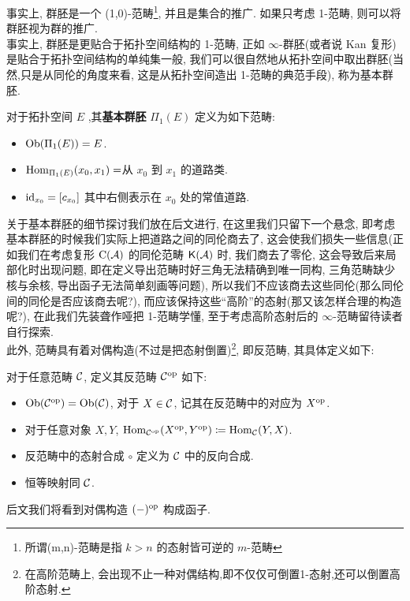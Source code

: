 事实上, 群胚是一个 (1,0)-范畴\footnote{所谓(m,n)-范畴是指 $k>n$ 的态射皆可逆的 $m$-范畴}, 并且是集合的推广. 如果只考虑 1-范畴, 则可以将群胚视为群的推广.\\
事实上, 群胚是更贴合于拓扑空间结构的 1-范畴, 正如 $\infty$-群胚(或者说 Kan 复形)是贴合于拓扑空间结构的单纯集一般, 我们可以很自然地从拓扑空间中取出群胚(当然,只是从同伦的角度来看, 这是从拓扑空间造出 1-范畴的典范手段), 称为基本群胚.
\begin{example}
    对于拓扑空间 $E$ ,其\textbf{基本群胚} $\Pi_{1}(E)$ 定义为如下范畴:
    \begin{itemize}
        \item $\operatorname{Ob}(\Pi_1(E)) = E$.
        \item $\operatorname{Hom}_{\Pi_1(E)}(x_0,x_1) = $从 $x_0$ 到 $x_1$ 的道路类.
        \item $\mathrm{id}_{x_0} = [c_{x_0}]$ 其中右侧表示在 $x_0$ 处的常值道路.
    \end{itemize}
\end{example}
关于基本群胚的细节探讨我们放在后文进行, 在这里我们只留下一个悬念, 即考虑基本群胚的时候我们实际上把道路之间的同伦商去了, 这会使我们损失一些信息(正如我们在考虑复形 $\operatorname{C}(\cal{A})$ 的同伦范畴 $\mathsf{K}(\cal{A})$ 时, 我们商去了零伦, 这会导致后来局部化时出现问题, 即在定义导出范畴时好三角无法精确到唯一同构, 三角范畴缺少核与余核, 导出函子无法简单刻画等问题), 所以我们不应该商去这些同伦(那么同伦间的同伦是否应该商去呢?), 而应该保持这些``高阶''的态射(那又该怎样合理的构造呢?), 在此我们先装聋作哑把 1-范畴学懂, 至于考虑高阶态射后的 $\infty$-范畴留待读者自行探索.\\
此外, 范畴具有着对偶构造(不过是把态射倒置)\footnote{在高阶范畴上, 会出现不止一种对偶结构,即不仅仅可倒置1-态射,还可以倒置高阶态射.}, 即反范畴, 其具体定义如下:
\begin{definition}
    对于任意范畴 $\cal{C}$, 定义其反范畴 $\cal{C}^{\operatorname{op}}$ 如下:
    \begin{itemize}
        \item $\operatorname{Ob}(\cal{C}^{\operatorname{op}}) = \operatorname{Ob}(\cal{C})$, 对于 $X\in \cal{C}$, 记其在反范畴中的对应为 $X^{\operatorname{op}}$.
        \item 对于任意对象 $X,Y$, $\operatorname{Hom}_{\cal{C}^{\operatorname{op}}}(X^{\operatorname{op}},Y^{\operatorname{op}}) \coloneqq \operatorname{Hom}_{\cal{C}}(Y,X)$.
        \item 反范畴中的态射合成 $\circ$ 定义为 $\cal{C}$ 中的反向合成.
        \item 恒等映射同 $\cal{C}$.
    \end{itemize}
\end{definition}
后文我们将看到对偶构造 $(-)^{\operatorname{op}}$ 构成函子.
